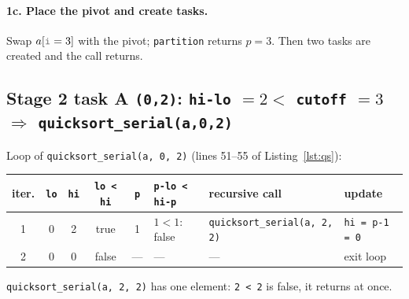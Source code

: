 \documentclass[11pt,a4paper]{article}
\let\origtexttt\texttt
\renewcommand{\texttt}[1]{\textcolor{black!60}{\origtexttt{#1}}}
\newcommand{\chg}[1]{\textcolor{red!80!black}{\textbf{#1}}}
\newcommand{\arr}[1]{%
  \foreach \v/\c [count=\k from 0] in {#1} {
    \node[\c] at (0.85*\k,0) {\v};
    \node[font=\tiny, text=gray] at (0.85*\k,0.6) {\k};
  }}
\begin{document}
\paragraph{1c. Place the pivot and create tasks.} Swap $a[\texttt{i}=3]$ with the pivot;
\texttt{partition} returns $p=3$. Then two tasks are created and the call returns.
\begin{center}
\end{center}

\subsection*{Stage 2 \quad task A \texttt{(0,2)}: \texttt{hi-lo} $= 2 <$ \texttt{cutoff} $= 3$ $\Rightarrow$ \texttt{quicksort\_serial(a,0,2)}}
\noindent Loop of \texttt{quicksort\_serial(a, 0, 2)} (lines 51--55 of Listing~\ref{lst:qs}):
\begin{center}
\small
\begin{tabular}{@{}ccccclll@{}}
\toprule
iter. & \texttt{lo} & \texttt{hi} & \texttt{lo < hi} & \texttt{p} & \texttt{p-lo < hi-p} & recursive call & update \\ \midrule
1 & 0 & 2 & true & 1 & $1<1$: false & \texttt{quicksort\_serial(a, 2, 2)} & \texttt{hi = p-1 = 0} \\
2 & 0 & 0 & false & --- & --- & --- & exit loop \\
\bottomrule
\end{tabular}
\end{center}
\texttt{quicksort\_serial(a, 2, 2)} has one element: \texttt{2 < 2} is false, it returns at once.
\end{document}
